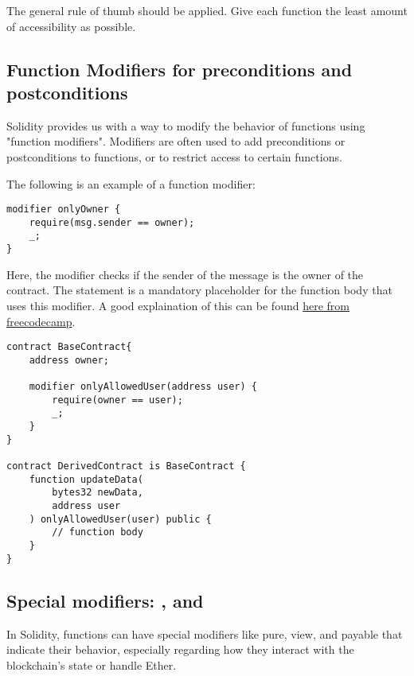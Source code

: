 The general rule of thumb should be applied. Give each function the least amount of accessibility as possible.

\subsection{Function Modifiers for preconditions and postconditions}
Solidity provides us with a way to modify the behavior of functions using "function modifiers". Modifiers are often used to add preconditions or postconditions to functions, or to restrict access to certain functions.

The following is an example of a function modifier:

\begin{lstlisting}[language=Solidity, caption=Solidity isOwner modifier]
modifier onlyOwner {
    require(msg.sender == owner);
    _;
}
\end{lstlisting}

Here, the  modifier checks if the sender of the message is the owner of the contract. The \code{\_;} statement is a mandatory placeholder for the function body that uses this modifier. A good explaination of this can be found \href{https://www.freecodecamp.org/news/what-are-solidity-modifiers/}{here from freecodecamp}.

\label{lst:contract-with-modifiers}
\begin{lstlisting}[language=Solidity, caption=Contract with modifiers]
contract BaseContract{
    address owner;

    modifier onlyAllowedUser(address user) {
        require(owner == user);
        _;
    }
}

contract DerivedContract is BaseContract {
    function updateData(
        bytes32 newData, 
        address user
    ) onlyAllowedUser(user) public {
        // function body
    }
}
\end{lstlisting}

\subsection{Special modifiers: ,  and }
\label{sec:special-modifiers}
In Solidity, functions can have special modifiers like pure, view, and payable that indicate their behavior, especially regarding how they interact with the blockchain's state or handle Ether.


